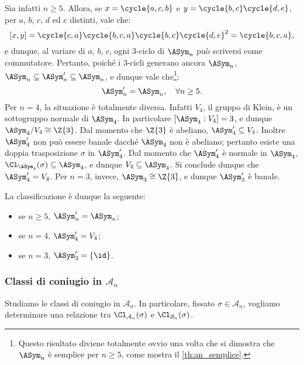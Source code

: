 \documentclass[11pt]{scrartcl}
\begin{document}
	
	Sia infatti $n \geq 5$. Allora, se $x = \cycle{a, c, b}$ e
	$y = \cycle{b, c}\cycle{d, e}$, per $a$, $b$, $c$, $d$ ed $e$ distinti,
	vale che:
	\[ [x, y] = \cycle{c, a} \cycle{b, c, a} \cycle{b, c} \cycle{d, e}^2 = \cycle{b, c, a}, \]
	e dunque, al variare di $a$, $b$, $c$, ogni $3$-ciclo di $\ASym_n$ può scriversi
	come commutatore. Pertanto, poiché i $3$-cicli generano ancora $\ASym_n$, $\ASym_n \subseteq \ASym_n' \subseteq \ASym_n$, e dunque vale che\footnote{
		Questo risultato diviene totalmente ovvio una volta che si dimostra
		che $\ASym_n$ è semplice per $n \geq 5$, come mostra il
		\autoref{th:an_semplice}.
	}:
	\[ \ASym_n' = \ASym_n, \quad \forall n \geq 5. \]
	Per $n = 4$, la situazione è totalmente diversa. Infatti $V_4$, il gruppo
	di Klein, è un sottogruppo normale di $\ASym_4$. In particolare
	$[\ASym_4 : V_4] = 3$, e dunque $\ASym_4 / V_4 \cong \Z{3}$. Dal momento
	che $\Z{3}$ è abeliano, $\ASym_4' \subseteq V_4$. Inoltre $\ASym_4'$ non
	può essere banale dacché $\ASym_4$ non è abeliano; pertanto esiste
	una doppia trasposizione $\sigma$ in $\ASym_4'$. Dal momento che
	$\ASym_4'$ è normale in $\ASym_4$, $\Cl_{\ASym_4}(\sigma) \subseteq \ASym_4$,
	e dunque $V_4 \subseteq \ASym_4$. Si conclude dunque che $\ASym_4' = V_4$.
	Per $n = 3$, invece, $\ASym_3 \cong \Z{3}$, e dunque $\ASym_3'$ è banale. \medskip
	
	
	La classificazione è dunque la seguente:
	\begin{itemize}
		\item se $n \geq 5$, $\ASym_n' = \ASym_n$;
		\item se $n = 4$, $\ASym_4' = V_4$;
		\item se $n = 3$, $\ASym_3' = \{\id\}$. 
	\end{itemize}
	 
	
	\subsubsection{Classi di coniugio in \texorpdfstring{$\mathcal{A}_n$}{Aₙ}}
	
	Studiamo le classi di coniugio in $\mathcal{A}_n$. In particolare,
	fissato $\sigma \in \mathcal{A}_n$, vogliamo determinare una relazione tra
	$\Cl_{\mathcal{A}_n}(\sigma)$ e $\Cl_{\mathcal{S}_n}(\sigma)$. \medskip
	
\end{document}
